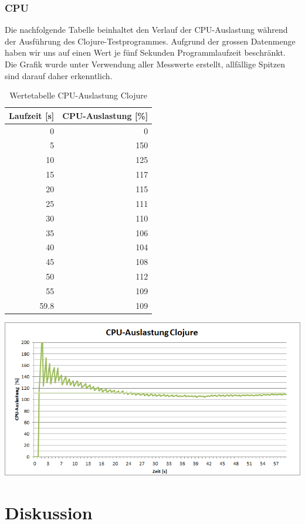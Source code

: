\documentclass{fancydocument}
\begin{document}
\subsubsection{CPU}
Die nachfolgende Tabelle beinhaltet den Verlauf der CPU-Auslastung während der Ausführung des Clojure-Testprogrammes. Aufgrund der grossen Datenmenge haben wir uns auf einen Wert je fünf Sekunden Programmlaufzeit beschränkt. Die Grafik wurde unter Verwendung aller Messwerte erstellt, allfällige Spitzen sind darauf daher erkenntlich.
\begin{table}[h!]
\centering
\begin{tabular}{|r|r|} \hline
\textbf{Laufzeit [s]} & \textbf{CPU-Auslastung [\%]}\\
\hline
0 & 0\\
\hline
5 & 150\\
\hline
10 & 125\\
\hline
15 & 117\\
\hline
20 & 115\\
\hline
25 & 111\\
\hline
30 & 110\\
\hline
35 & 106\\
\hline
40 & 104\\
\hline
45 & 108\\
\hline
50 & 112\\
\hline
55 & 109\\
\hline
59.8 & 109\\
\hline
\end{tabular}
\caption{Wertetabelle CPU-Auslastung Clojure}
\end{table}
\begin{center}
\includegraphics[width=\linewidth]{bilder/CPUClojure.png}
\end{center}

\section{Diskussion}
\end{document}

